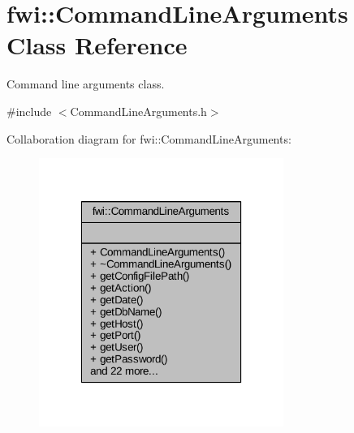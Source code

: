 \hypertarget{classfwi_1_1CommandLineArguments}{\section{fwi\-:\-:Command\-Line\-Arguments Class Reference}
\label{classfwi_1_1CommandLineArguments}
}


Command line arguments class.  




{\ttfamily \#include $<$Command\-Line\-Arguments.\-h$>$}



Collaboration diagram for fwi\-:\-:Command\-Line\-Arguments\-:
\nopagebreak
\begin{figure}[H]
\begin{center}
\leavevmode
\includegraphics[width=226pt]{classfwi_1_1CommandLineArguments__coll__graph}
\end{center}
\end{figure}
